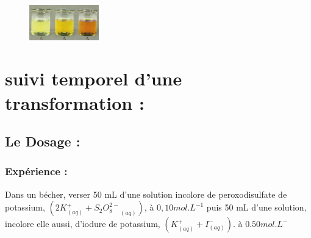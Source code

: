 \documentclass[12pt]{article}
\begin{document}
\begin{figure}
	\vspace{-3cm}
	\includegraphics[width=0.27\textwidth]{./img/STidureavecperoxo.png}
\end{figure}



\section{suivi temporel d'une transformation :  }
\subsection{Le Dosage : }
\subsubsection{Expérience : }
Dans un bécher, verser 50 mL d'une solution incolore de peroxodisulfate de potassium, 
$(2K^+_{(aq)} + {S_2O_8^{2-}}_{(aq)})$, à $0,10 mol.L^{-1}$ puis 50 mL d'une solution, incolore elle aussi, d'iodure de potassium, $(K^+_{(aq)} +I^-_{(aq)})$.
à $0.50 mol.L^-$
\end{document}
